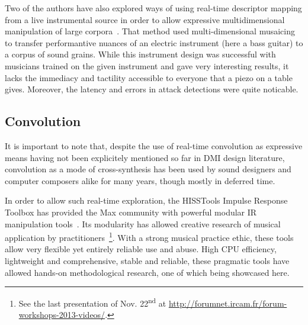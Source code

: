 \label{sandbox}
Two of the authors have also explored ways of using real-time descriptor mapping from a live instrumental source in order to allow expressive multidimensional manipulation of large corpora~\cite{TremblaySchwarz-nime2010-surfing-the-waves}. That method used multi-dimensional musaicing to transfer performantive nuances of an electric instrument (here a bass guitar) to a corpus of sound grains. While this instrument design was successful with musicians trained on the given instrument and gave very interesting results, it lacks the immediacy and tactility accessible to everyone that a piezo on a table gives. Moreover, the latency and errors in attack detections were quite noticable.


\subsection{Convolution}

It is important to note that, despite the use of real-time convolution as expressive means having not been explicitely mentioned so far in DMI design literature, convolution as a mode of cross-synthesis has been used by sound designers and computer composers alike for many years, though mostly in deferred time.

In order to allow such real-time exploration, the HISSTools Impulse Response Toolbox has provided the Max community with powerful modular IR manipulation tools~\cite{HarkerTremblay-icmc2012-hisstools}. Its modularity has allowed creative research of musical application by practitioners~\cite{HarkerTremblay-forum2013-rethinking-the-box}\footnote{See  the last presentation of Nov. 22\textsuperscript{nd} at \url{http://forumnet.ircam.fr/forum-workshops-2013-videos/}.}. With a strong musical practice ethic, these tools allow very flexible yet entirely reliable use and abuse. High CPU efficiency, lightweight and comprehensive, stable and reliable, these pragmatic tools have allowed hands-on methodological research, one of which being showcased here.



